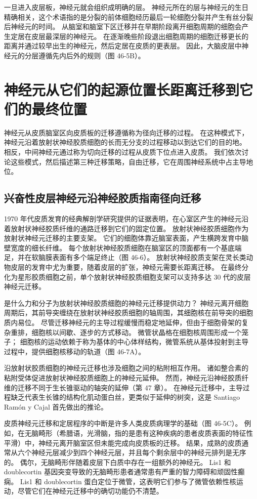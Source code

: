 一旦进入皮层板，神经元就会组织成明确的层。 神经元所在的层与神经元的生日精确相关，这个术语指的是分裂的前体细胞经历最后一轮细胞分裂并产生有丝分裂后神经元的时间。 从脑室和脑室下区迁移并在早期阶段离开细胞周期的细胞会产生定居在皮层最深层的神经元。 在逐渐晚些阶段退出细胞周期的细胞迁移更长的距离并通过较早出生的神经元，然后定居在皮质的更表层。 因此，大脑皮层中神经元的分层遵循先内后外的规则（图 46-5B）。


\section{神经元从它们的起源位置长距离迁移到它们的最终位置}
神经元从皮质脑室区向皮质板的迁移遵循称为径向迁移的过程。 在这种模式下，神经元沿着放射状神经胶质细胞的长而无分支的过程移动以到达它们的目的地。 相反，中间神经元通过称为切向迁移的过程从皮质下位点进入皮质。 我们依次讨论这些模式，然后描述第三种迁移策略，自由迁移，它在周围神经系统中占主导地位。

\subsection{兴奋性皮层神经元沿神经胶质指南径向迁移}
1970 年代皮质发育的经典解剖学研究提供的证据表明，在心室区产生的神经元沿着放射状神经胶质纤维的通路迁移到它们的固定位置。 放射状神经胶质细胞作为放射状神经元迁移的主要支架。 它们的细胞体靠近脑室表面，产生横跨发育中脑壁宽度的细长纤维。 每个放射状神经胶质细胞在脑室区的顶面都有一个基底端足，并在软脑膜表面有多个端足终止（图 46-6）。 放射状神经胶质支架在灵长类动物皮层的发育中尤为重要，随着皮层的扩张，神经元需要长距离迁移。 在最终分化为星形胶质细胞之前，单个放射状神经胶质细胞支架可以支持多达 30 代的皮层神经元迁移。

是什么力和分子为放射状神经胶质细胞的神经元迁移提供动力？ 神经元离开细胞周期后，其前导突缠绕在放射状神经胶质细胞的轴周围，其细胞核在前导突的细胞质内易位。 尽管迁移神经元的主导过程缓慢而稳定地延伸，但由于细胞骨架的复杂重排，细胞核以间歇、逐步的方式移动。 微管状晶格在细胞核周围形成一个笼子； 细胞核的运动依赖于称为基体的中心体样结构，微管系统从基体投射到主导过程中，提供细胞核移动的轨道（图 46-7A）。

沿放射状胶质细胞的神经元迁移也涉及细胞之间的粘附相互作用。 诸如整合素的粘附受体促进放射状神经胶质细胞上的神经元延伸。 然而，神经元沿神经胶质纤维的迁移不同于生长锥驱动的轴突的延伸（第 47 章）。 在神经元迁移中，主导过程缺乏代表生长锥的结构化肌动蛋白丝，更类似于延伸的树突，这是 Santiago Ramón y Cajal 首先做出的推论。

皮质神经元迁移和定居程序的中断是许多人类皮质病理学的基础（图 46-5C）。 例如，在无脑畸形（希腊语，光滑脑，指的是患有这种疾病的患者皮质表面的特征性平滑）中，神经元离开脑室区但未能完成向皮质板的迁移。 结果，成熟的皮质通常从六个神经元层减少到四个神经元层，并且每个剩余层中的神经元排列是无序的。 偶尔，无脑畸形伴随着皮层下白质中存在一组额外的神经元。 Lis1 和 doublecortin 基因突变导致的无脑畸形患者通常患有严重的智力障碍和顽固性癫痫。 Lis1 和 doublecortin 蛋白定位于微管，这表明它们参与了微管依赖性核运动，尽管它们在神经元迁移中的确切功能仍不清楚。

